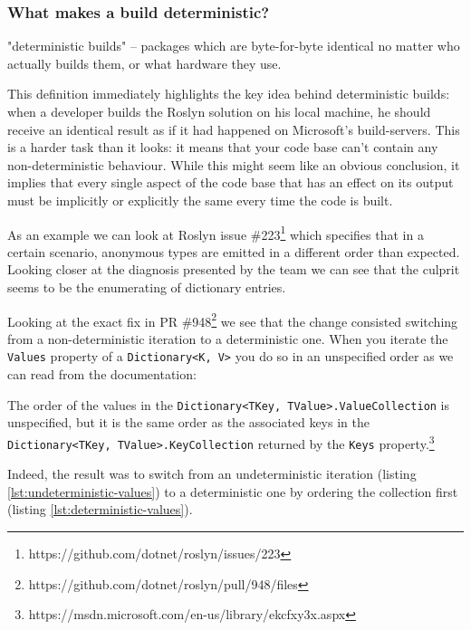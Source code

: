 \subsubsection{What makes a build deterministic?}
\label{sec:deterministic-builds-what}

\begin{displayquote}
"deterministic builds" -- packages which are byte-for-byte identical no matter who actually builds them, or what hardware they use.\parencite{Perry2013} 
\end{displayquote}

\noindent This definition immediately highlights the key idea behind deterministic builds: when a developer builds the Roslyn solution on his local machine, he should receive an identical result as if it had happened on Microsoft's build-servers. This is a harder task than it looks: it means that your code base can't contain any non-deterministic behaviour. While this might seem like an obvious conclusion, it implies that every single aspect of the code base that has an effect on its output must be implicitly or explicitly the same every time the code is built. 

As an example we can look at Roslyn issue \#223\footnote{https://github.com/dotnet/roslyn/issues/223} which specifies that in a certain scenario, anonymous types are emitted in a different order than expected. Looking closer at the diagnosis presented by the team we can see that the culprit seems to be the enumerating of dictionary entries.

Looking at the exact fix in PR \#948\footnote{https://github.com/dotnet/roslyn/pull/948/files} we see that the change consisted switching from a non-deterministic iteration to a deterministic one. When you iterate the \verb|Values| property of a \verb|Dictionary<K, V>| you do so in an unspecified order as we can read from the documentation:

\begin{displayquote}
The order of the values in the \verb|Dictionary<TKey, TValue>.ValueCollection| is unspecified, but it is the same order as the associated keys in the \verb|Dictionary<TKey, TValue>.KeyCollection| returned by the \verb|Keys| property.\footnote{https://msdn.microsoft.com/en-us/library/ekcfxy3x.aspx}
\end{displayquote}

\noindent Indeed, the result was to switch from an undeterministic iteration (listing \ref{lst:undeterministic-values}) to a deterministic one by ordering the collection first (listing \ref{lst:deterministic-values}).

